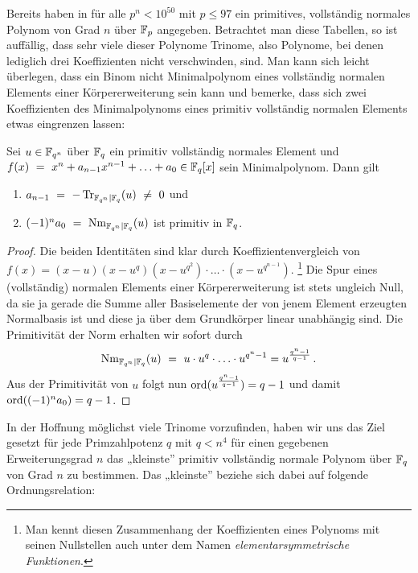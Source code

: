 Bereits \citeauthor{morgan1996} haben in \autocite{morgan1996} für alle 
$p^n < 10^{50}$ mit $p\leq 97$ ein primitives, vollständig normales Polynom 
von Grad $n$ über $\mathbb{F}_p$ angegeben. Betrachtet man diese Tabellen, so ist
auffällig, dass sehr viele dieser Polynome Trinome, also Polynome, bei denen
lediglich drei Koeffizienten nicht verschwinden, sind. Man kann sich leicht
überlegen, dass ein Binom nicht Minimalpolynom eines vollständig normalen
Elements einer Körpererweiterung sein kann und bemerke, dass sich 
zwei Koeffizienten des Minimalpolynoms eines primitiv vollständig normalen
Elements etwas eingrenzen lassen:

\begin{lemma}
  \label{lemma:pcn_koeff}
  Sei $u \in \mathbb{F}_{q^n}$ über $\mathbb{F}_q$ ein primitiv vollständig normales Element
  und $f(x) \ =\  x^n + a_{n-1}x^{n-1}+\ldots+a_0 \in \mathbb{F}_q[x]$ 
  sein Minimalpolynom. Dann gilt
  \begin{enumerate}
    \item $a_{n-1} \ =\  -\operatorname{Tr}_{\mathbb{F}_{q^n}\mid \mathbb{F}_q}(u) \ \neq\  0$ und 
    \item $(-1)^na_0 \ =\  \operatorname{Nm}_{\mathbb{F}_{q^n}\mid \mathbb{F}_q}(u)$ ist primitiv in $\mathbb{F}_q$.
  \end{enumerate}
\end{lemma}
\begin{proof}
  Die beiden Identitäten sind klar durch Koeffizientenvergleich von
  $f(x) = (x-u)(x-u^q)(x-u^{q^2})\cdot\ldots\cdot(x-u^{q^{n-1}})$.%
  \footnote{Man kennt diesen Zusammenhang der 
    Koeffizienten eines Polynoms mit seinen Nullstellen auch unter dem Namen
    \emph{elementarsymmetrische Funktionen}.}
  Die Spur eines (vollständig) normalen Elements einer Körpererweiterung ist
  stets ungleich Null, da sie ja gerade die Summe aller Basiselemente der 
  von jenem Element erzeugten Normalbasis ist und diese ja über dem Grundkörper
  linear unabhängig sind. 
  Die Primitivität der Norm erhalten wir sofort durch
  \[ \operatorname{Nm}_{\mathbb{F}_{q^n}\mid \mathbb{F}_q}(u) \ =\  u\cdot u^q\cdot \ldots\cdot u^{q^n-1}
    = u^{\frac{q^n-1}{q-1}}\,.\]
  Aus der Primitivität von $u$ folgt nun $\operatorname{ord}(u^{\frac{q^n-1}{q-1}}) = q-1$
  und damit $\operatorname{ord}((-1)^na_0) = q-1$.
\end{proof}

In der Hoffnung möglichst viele Trinome vorzufinden, haben wir uns das Ziel
gesetzt für jede Primzahlpotenz $q$ mit $q < n^4$ für einen gegebenen
Erweiterungsgrad $n$ das „kleinste” primitiv vollständig normale Polynom
über $\mathbb{F}_q$ von Grad $n$ zu bestimmen. Das „kleinste” beziehe sich dabei auf
folgende Ordnungsrelation:

